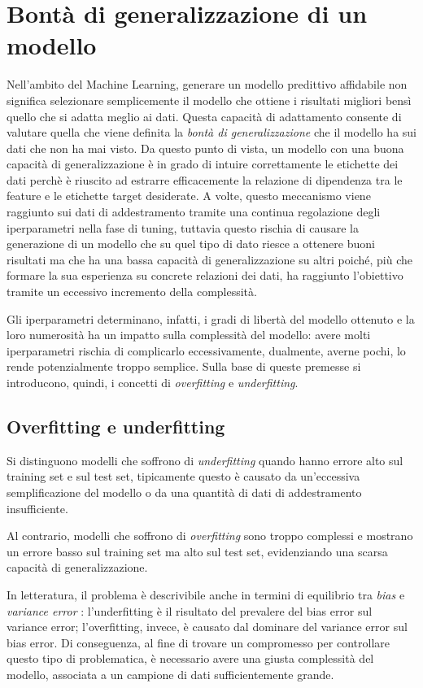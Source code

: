 \documentclass[12pt]{report}
\theoremstyle{definition}
\begin{document}
\section{Bontà di generalizzazione di un modello}\label{generalization}
Nell'ambito del Machine Learning, generare un modello predittivo affidabile non significa selezionare semplicemente il modello che ottiene i risultati migliori bensì quello che si adatta meglio ai dati.
Questa capacità di adattamento consente di valutare quella che viene definita la \textit{bontà di generalizzazione} che il modello ha sui dati che non ha mai visto. Da questo punto di vista, un modello con una buona capacità di generalizzazione è in grado di intuire correttamente le etichette dei dati perchè è riuscito ad estrarre efficacemente la relazione di dipendenza tra le feature e le etichette target desiderate.
A volte, questo meccanismo viene raggiunto sui dati di addestramento tramite una continua regolazione degli iperparametri nella fase di tuning, tuttavia questo rischia di causare la generazione di un modello che su quel tipo di dato riesce a ottenere buoni risultati ma che ha una bassa capacità di generalizzazione su altri poiché, più che formare la sua esperienza su concrete relazioni dei dati, ha raggiunto l'obiettivo tramite un eccessivo incremento della complessità.

Gli iperparametri determinano, infatti, i gradi di libertà del modello ottenuto e la loro numerosità ha un impatto sulla complessità del modello: avere molti iperparametri rischia di complicarlo eccessivamente, dualmente, averne pochi, lo rende potenzialmente troppo semplice. 
Sulla base di queste premesse si introducono, quindi, i concetti di \textit{overfitting} e \textit{underfitting}.

\subsection{Overfitting e underfitting}
Si distinguono modelli che soffrono di \textit{underfitting} quando hanno errore alto sul training set e sul test set, tipicamente questo è causato da un'eccessiva semplificazione del modello o da una quantità di dati di addestramento insufficiente.

Al contrario, modelli che soffrono di \textit{overfitting} sono troppo complessi e mostrano un errore basso sul training set ma alto sul test set, evidenziando una scarsa capacità di generalizzazione.

In letteratura, il problema è descrivibile anche in termini di equilibrio tra \textit{bias} e \textit{variance error} \cite{31}: l'underfitting è il risultato del prevalere del bias error sul variance error; l'overfitting, invece, è causato dal dominare del variance error sul bias error.
Di conseguenza, al fine di trovare un compromesso per controllare questo tipo di problematica, è necessario avere una giusta complessità del modello, associata a un campione di dati sufficientemente grande.
\end{document}
